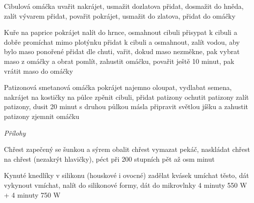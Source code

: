 \documentclass[12pt,a4paper]{article}
\begin{document}
\begin{recipe}{Cibulová omáčka}
   uvařit
  nakrájet, usmažit dozlatova
  přidat, dosmažit do hněda, zalít vývarem
   přidat, povařit
  pokrájet, usmažit do zlatova, přidat do omáčky
\end{recipe}
\newpage

\begin{recipe}{Kuře na paprice}
   pokrájet
   nalít do hrnce, osmahnout cibuli
   přisypat k cibuli a dobře promíchat mimo plotýnku
   přidat k cibuli a osmahnout, zalít vodou, aby bylo maso ponořené
   přidat dle chuti, vařit, dokud maso nezměkne, pak vybrat maso z omáčky a obrat
   pomlít, zahustit omáčku, povařit ještě 10 minut, pak vrátit maso do omáčky
\end{recipe}
\newpage

\begin{recipe}{Patizonová smetanová omáčka}
   pokrájet najemno
   oloupat, vydlabat semena, nakrájet na kostičky
   na půlce zpěnit cibuli, přidat patizony
   ochutit patizony
   zalít patizony, dusit 20 minut
   s druhou půlkou másla připravit světlou jíšku a zahustit patizony
   zjemnit omáčku
\end{recipe}
\newpage

\vspace*{\fill}
\hfill {\Huge\it Přílohy}\hfill
\vspace*{\fill}
\newpage

\begin{recipe}{Chřest zapečený se šunkou a sýrem}
   obalit chřest
   vymazat pekáč, naskládat chřest
   na chřest (nezakrýt hlavičky), péct při 200 stup\-ních pět až osm minut
\end{recipe}
\newpage

\begin{recipe}{Kynuté knedlíky v silikonu (houskové i ovocné)}
   zadělat kvásek
   umíchat těsto, dát vykynout
   vmíchat, nalít do silikonové formy, dát do mikrovlnky 4 minuty 550 W + 4 minuty 750 W
\end{recipe}
\newpage
\end{document}
